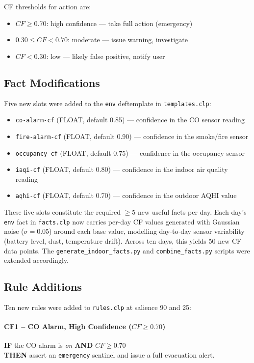 \documentclass{article}
\begin{document}
CF thresholds for action are:
\begin{itemize}
    \item $CF \geq 0.70$: high confidence — take full action (emergency)
    \item $0.30 \leq CF < 0.70$: moderate — issue warning, investigate
    \item $CF < 0.30$: low — likely false positive, notify user
\end{itemize}

\subsection{Fact Modifications}

Five new slots were added to the \texttt{env} deftemplate in \texttt{templates.clp}:

\begin{itemize}
    \item \texttt{co-alarm-cf} (FLOAT, default 0.85) — confidence in the CO sensor reading
    \item \texttt{fire-alarm-cf} (FLOAT, default 0.90) — confidence in the smoke/fire sensor
    \item \texttt{occupancy-cf} (FLOAT, default 0.75) — confidence in the occupancy sensor
    \item \texttt{iaqi-cf} (FLOAT, default 0.80) — confidence in the indoor air quality reading
    \item \texttt{aqhi-cf} (FLOAT, default 0.70) — confidence in the outdoor AQHI value
\end{itemize}

These five slots constitute the required $\geq 5$ new useful facts per day. Each day's \texttt{env} fact in \texttt{facts.clp} now carries per-day CF values generated with Gaussian noise ($\sigma = 0.05$) around each base value, modelling day-to-day sensor variability (battery level, dust, temperature drift). Across ten days, this yields 50 new CF data points. The \texttt{generate\_indoor\_facts.py} and \texttt{combine\_facts.py} scripts were extended accordingly.

\subsection{Rule Additions}

Ten new rules were added to \texttt{rules.clp} at salience 90 and 25:

\paragraph{CF1 -- CO Alarm, High Confidence ($CF \geq 0.70$)}
\textbf{IF} the CO alarm is \emph{on} \textbf{AND} $CF \geq 0.70$ \\
\textbf{THEN} assert an \texttt{emergency} sentinel and issue a full evacuation alert.
\end{document}
